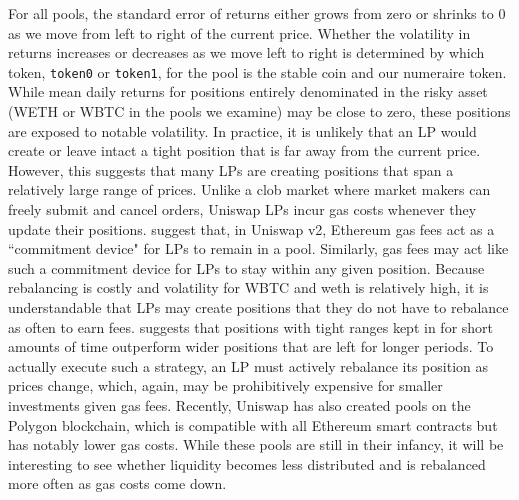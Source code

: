 \documentclass[11pt]{article}
\begin{document}
For all pools, the standard error of returns either grows from zero or shrinks to 0 as we move from left to right of the current price. Whether the volatility in returns increases or decreases as we move left to right is determined by which token, \texttt{token0} or \texttt{token1}, for the pool is the stable coin and our numeraire token. While mean daily returns for positions entirely denominated in the risky asset (WETH or WBTC in the pools we examine) may be close to zero, these positions are exposed to notable volatility. In practice, it is unlikely that an LP would create or leave intact a tight position that is far away from the current price. However, this suggests that many LPs are creating positions that span a relatively large range of prices. Unlike a \gls{clob} market where market makers can freely submit and cancel orders, Uniswap LPs incur gas costs whenever they update their positions. \citet{Lehar2021DecentralizedE} suggest that, in Uniswap v2, Ethereum gas fees act as a ``commitment device" for LPs to remain in a pool. Similarly, gas fees may act like such a commitment device for LPs to stay within any given position. Because rebalancing is costly and volatility for WBTC and \gls{weth} is relatively high, it is understandable that LPs may create positions that they do not have to rebalance as often to earn fees. \citet{LambertMedium2} suggests that positions with tight ranges kept in for short amounts of time outperform wider positions that are left for longer periods. To actually execute such a strategy, an LP must actively rebalance its position as prices change, which, again, may be prohibitively expensive for smaller investments given gas fees. Recently, Uniswap has also created pools on the Polygon \gls{blockchain}, which is compatible with all Ethereum smart contracts but has notably lower gas costs. While these pools are still in their infancy, it will be interesting to see whether liquidity becomes less distributed and is rebalanced more often as gas costs come down.
\end{document}
